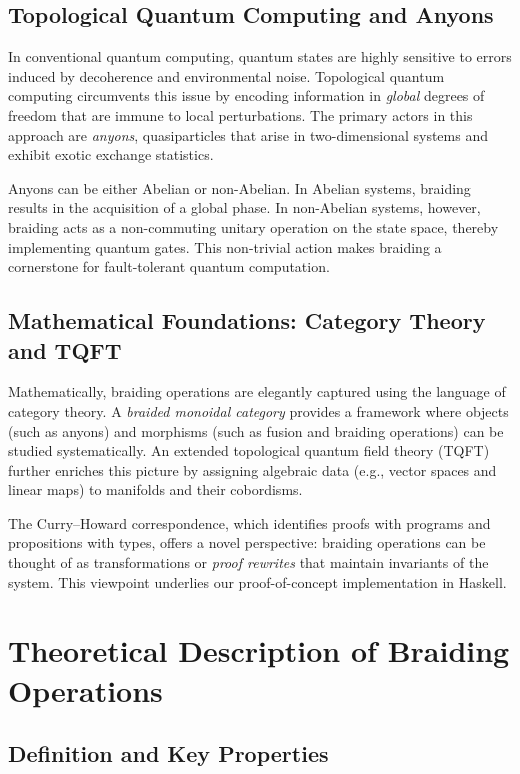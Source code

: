 \documentclass[12pt]{article}
\begin{document}
\subsection{Topological Quantum Computing and Anyons}

In conventional quantum computing, quantum states are highly sensitive to errors induced by decoherence and environmental noise. Topological quantum computing circumvents this issue by encoding information in \emph{global} degrees of freedom that are immune to local perturbations. The primary actors in this approach are \emph{anyons}, quasiparticles that arise in two-dimensional systems and exhibit exotic exchange statistics.

Anyons can be either Abelian or non-Abelian. In Abelian systems, braiding results in the acquisition of a global phase. In non-Abelian systems, however, braiding acts as a non-commuting unitary operation on the state space, thereby implementing quantum gates. This non-trivial action makes braiding a cornerstone for fault-tolerant quantum computation.

\subsection{Mathematical Foundations: Category Theory and TQFT}

Mathematically, braiding operations are elegantly captured using the language of category theory. A \emph{braided monoidal category} provides a framework where objects (such as anyons) and morphisms (such as fusion and braiding operations) can be studied systematically. An extended topological quantum field theory (TQFT) further enriches this picture by assigning algebraic data (e.g., vector spaces and linear maps) to manifolds and their cobordisms.

The Curry–Howard correspondence, which identifies proofs with programs and propositions with types, offers a novel perspective: braiding operations can be thought of as transformations or \emph{proof rewrites} that maintain invariants of the system. This viewpoint underlies our proof-of-concept implementation in Haskell.

\section{Theoretical Description of Braiding Operations}

\subsection{Definition and Key Properties}
\end{document}
